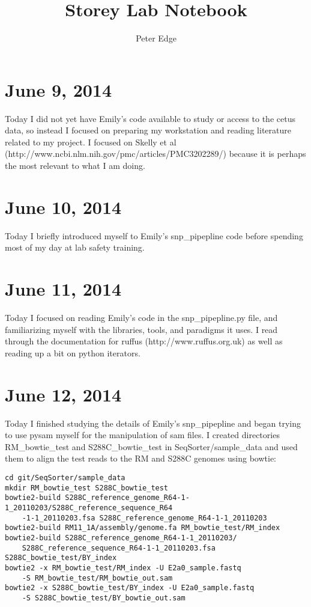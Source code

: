 \documentclass[11pt]{article}
\title{\textbf{Storey Lab Notebook}}
\author{Peter Edge}
\begin{document}
\maketitle

\section*{June 9, 2014}
Today I did not yet have Emily's code available to study or access to the cetus data, so instead I focused on preparing my workstation and reading literature related to my project. I focused on Skelly et al (http://www.ncbi.nlm.nih.gov/pmc/articles/PMC3202289/) because it is perhaps the most relevant to what I am doing.

\section*{June 10, 2014}
Today I briefly introduced myself to Emily's snp\_pipepline code before spending most of my day at lab safety training.

\section*{June 11, 2014}
Today I focused on reading Emily's code in the snp\_pipepline.py file, and familiarizing myself with the libraries, tools, and paradigms it uses. I read through the documentation for ruffus (http://www.ruffus.org.uk) as well as reading up a bit on python iterators.
\section*{June 12, 2014}
Today I finished studying the details of Emily's snp\_pipepline and began trying to use pysam myself for the manipulation of sam files. I created directories RM\_bowtie\_test and S288C\_bowtie\_test in SeqSorter/sample\_data and used them to align the test reads to the RM and S288C genomes using bowtie:
\begin{verbatim}
cd git/SeqSorter/sample_data
mkdir RM_bowtie_test S288C_bowtie_test
bowtie2-build S288C_reference_genome_R64-1-1_20110203/S288C_reference_sequence_R64
    -1-1_20110203.fsa S288C_reference_genome_R64-1-1_20110203
bowtie2-build RM11_1A/assembly/genome.fa RM_bowtie_test/RM_index
bowtie2-build S288C_reference_genome_R64-1-1_20110203/
    S288C_reference_sequence_R64-1-1_20110203.fsa S288C_bowtie_test/BY_index
bowtie2 -x RM_bowtie_test/RM_index -U E2a0_sample.fastq
    -S RM_bowtie_test/RM_bowtie_out.sam
bowtie2 -x S288C_bowtie_test/BY_index -U E2a0_sample.fastq
    -S S288C_bowtie_test/BY_bowtie_out.sam
\end{verbatim}
\end{document}
